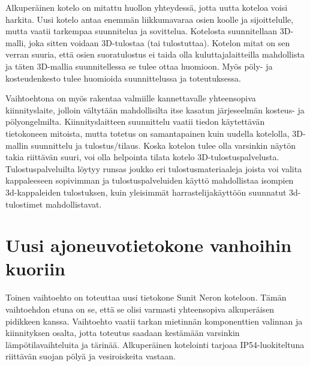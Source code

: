 Alkuperäinen kotelo on mitattu huollon yhteydessä, jotta uutta koteloa voisi harkita. Uusi kotelo antaa enemmän liikkumavaraa osien koolle ja sijoittelulle, mutta vaatii tarkempaa suunnitelua ja sovittelua. Kotelosta suunnitellaan 3D-malli, joka sitten voidaan 3D-tulostaa (tai tulostuttaa). Kotelon mitat on sen verran suuria, että osien suoratulostus ei taida olla kuluttajalaitteilla mahdollista ja täten 3D-mallia suunnitellessa se tulee ottaa huomioon. Myös pöly- ja kosteudenkesto tulee huomioida suunnittelussa ja toteutuksessa.

Vaihtoehtona on myös rakentaa valmiille kannettavalle yhteensopiva kiinnityslaite, jolloin vältytään mahdollisilta itse kasatun järjeseelmän kosteus- ja pölyongelmilta. Kiinnityslaitteen suunnittelu vaatii tiedon käytettävän tietokoneen mitoista, mutta totetus on samantapainen kuin uudella kotelolla, 3D-mallin suunnittelu ja tulostus/tilaus. Koska kotelon tulee olla varsinkin näytön takia riittävän suuri, voi olla helpointa tilata kotelo 3D-tulostuspalvelusta. Tulostuspalveluilta löytyy runsas joukko eri tulostusmateriaaleja joista voi valita kappaleeseen sopivimman ja tulostuspalveluiden käyttö mahdollistaa isompien 3d-kappaleiden tulostuksen, kuin yleisimmät harrastelijakäyttöön suunnatut 3d-tulostimet mahdollistavat. \cite{3d_shapeways} \cite{3d_ultimaker}



\section{Uusi ajoneuvotietokone vanhoihin kuoriin}

Toinen vaihtoehto on toteuttaa uusi tietokone Sunit Neron koteloon. Tämän vaihtoehdon etuna on se, että se olisi varmasti yhteensopiva alkuperäisen pidikkeen kanssa. Vaihtoehto vaatii tarkan mietinnän komponenttien valinnan ja kiinnityksen osalta, jotta toteutus saadaan kestämään varsinkin lämpötilavaihteluita ja tärinää. Alkuperäinen kotelointi tarjoaa IP54-luokiteltuna riittävän suojan pölyä ja vesiroiskeita vastaan.

